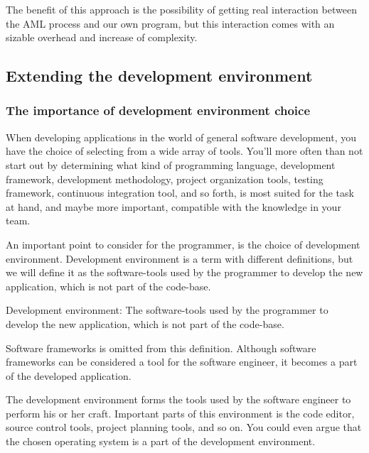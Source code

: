 The benefit of this approach is the possibility of getting real interaction between the AML process and our own program, but this interaction comes with an sizable overhead and increase of complexity.


\subsection{Extending the development environment} %
\label{sub:extending_the_development_environment}

\subsubsection{The importance of development environment choice} %
\label{ssub:the_importance_of_development_enviroment_choice}
When developing applications in the world of general software development, you have the choice of selecting from a wide array of tools. You'll more often than not start out by determining what kind of programming language, development framework, development methodology, project organization tools, testing framework, continuous integration tool, and so forth, is most suited for the task at hand, and maybe more important, compatible with the knowledge in your team.

An important point to consider for the programmer, is the choice of development environment. Development environment is a term with different definitions, but we will define it as the software-tools used by the programmer to develop the new application, which is not part of the code-base.

\begin{mydef}
Development environment: The software-tools used by the programmer to develop the new application, which is not part of the code-base.

Software frameworks is omitted from this definition. Although software frameworks can be considered a tool for the software engineer, it becomes a part of the developed application.
\end{mydef}

The development environment forms the tools used by the software engineer to perform his or her craft. Important parts of this environment is the code editor, source control tools, project planning tools, and so on. You could even argue that the chosen operating system is a part of the development environment.

